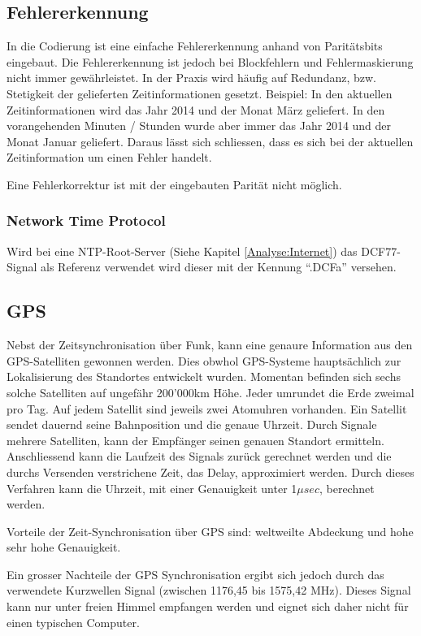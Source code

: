 \subsection{Fehlererkennung}
In die Codierung ist eine einfache Fehlererkennung anhand von Paritätsbits eingebaut. Die Fehlererkennung ist jedoch bei Blockfehlern und Fehlermaskierung nicht immer gewährleistet. In der Praxis wird häufig auf Redundanz, bzw. Stetigkeit der gelieferten Zeitinformationen gesetzt. Beispiel: In den aktuellen Zeitinformationen wird das Jahr 2014 und der Monat März geliefert. In den vorangehenden Minuten / Stunden wurde aber immer das Jahr 2014 und der Monat Januar geliefert. Daraus lässt sich schliessen, dass es sich bei der aktuellen Zeitinformation um einen Fehler handelt.

Eine Fehlerkorrektur ist mit der eingebauten Parität nicht möglich.

\subsubsection{Network Time Protocol}
Wird bei eine NTP-Root-Server (Siehe Kapitel \ref{Analyse:Internet}) das DCF77-Signal als Referenz verwendet wird dieser mit der Kennung "`.DCFa"' versehen.

\subsection{GPS}
Nebst der Zeitsynchronisation über Funk, kann eine genaure Information aus den GPS-Satelliten gewonnen werden. Dies obwhol GPS-Systeme hauptsächlich zur Lokalisierung des Standortes entwickelt wurden.
Momentan befinden sich sechs solche Satelliten auf ungefähr 200'000km Höhe. Jeder umrundet die Erde zweimal pro Tag. Auf jedem Satellit sind jeweils zwei Atomuhren vorhanden.
Ein Satellit sendet dauernd seine Bahnposition und die genaue Uhrzeit. Durch Signale mehrere Satelliten, kann der Empfänger seinen genauen Standort ermitteln.
Anschliessend kann die Laufzeit des Signals zurück gerechnet werden und die durchs Versenden verstrichene Zeit, das Delay, approximiert werden.
Durch dieses Verfahren kann die Uhrzeit, mit einer Genauigkeit unter 1${\mu}sec$, berechnet werden.

Vorteile der Zeit-Synchronisation über GPS sind: weltweilte Abdeckung und hohe sehr hohe Genauigkeit.

Ein grosser Nachteile der GPS Synchronisation ergibt sich jedoch durch das verwendete Kurzwellen Signal (zwischen 1176,45 bis 1575,42 MHz). Dieses Signal kann nur unter freien Himmel empfangen werden und eignet sich daher nicht für einen typischen Computer.

